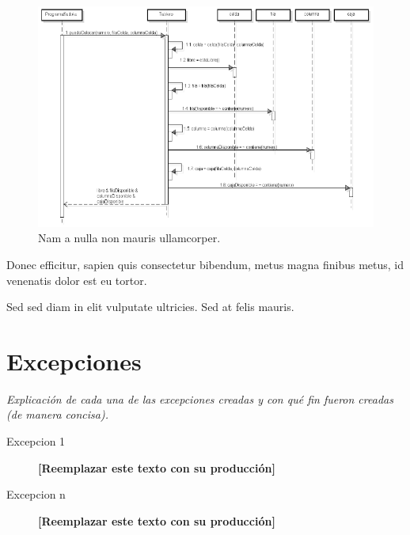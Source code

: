 \documentclass[titlepage,a4paper]{article}
\begin{document}
\begin{figure}[H]
\centering
\includegraphics[width=\textwidth]{diagrama_secuencia02.png}
\caption{\label{fig:seq02}Nam a nulla non mauris ullamcorper.}
\end{figure}

Donec efficitur, sapien quis consectetur bibendum, metus magna finibus metus, id venenatis dolor est eu tortor. 

Sed sed diam in elit vulputate ultricies. Sed at felis mauris.


\section{Excepciones}\label{sec:excepciones}
\textit{ Explicación de cada una de las excepciones creadas y con qué fin fueron creadas (de manera concisa).}
\begin{description}
\item[Excepcion 1] \textbf{[Reemplazar este texto con su producción]}
\item[Excepcion n] \textbf{[Reemplazar este texto con su producción]}
\end{description}
\end{document}
